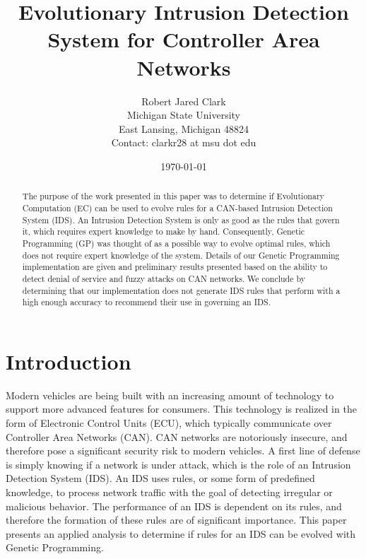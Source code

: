 \documentclass[10pt,conference]{IEEEtran}
\title{Evolutionary Intrusion Detection System for Controller Area Networks}
\author{Robert Jared Clark \\
Michigan State University \\
East Lansing, Michigan 48824 \\
Contact: clarkr28 at msu dot edu}
\date{\today}
\begin{document}
\maketitle

\begin{abstract}
The purpose of the work presented in this paper was to determine if Evolutionary Computation (EC) can be used to evolve rules for a CAN-based Intrusion Detection System (IDS).  An Intrusion Detection System is only as good as the rules that govern it, which requires expert knowledge to make by hand.  Consequently, Genetic Programming (GP) was thought of as a possible way to evolve optimal rules, which does not require expert knowledge of the system. Details of our Genetic Programming implementation are given and preliminary results presented based on the ability to detect denial of service and fuzzy attacks on CAN networks.  We conclude by determining that our implementation does not generate IDS rules that perform with a high enough accuracy to recommend their use in governing an IDS.
\end{abstract}

\section{Introduction}

Modern vehicles are being built with an increasing amount of technology to support more advanced features for consumers.  This technology is realized in the form of Electronic Control Units (ECU), which typically communicate over Controller Area Networks (CAN).  CAN networks are notoriously insecure, and therefore pose a significant security risk to modern vehicles.  A first line of defense is simply knowing if a network is under attack, which is the role of an Intrusion Detection System (IDS).  An IDS uses rules, or some form of predefined knowledge, to process network traffic with the goal of detecting irregular or malicious behavior.  The performance of an IDS is dependent on its rules, and therefore the formation of these rules are of significant importance.  This paper presents an applied analysis to determine if rules for an IDS can be evolved with Genetic Programming.
\end{document}
